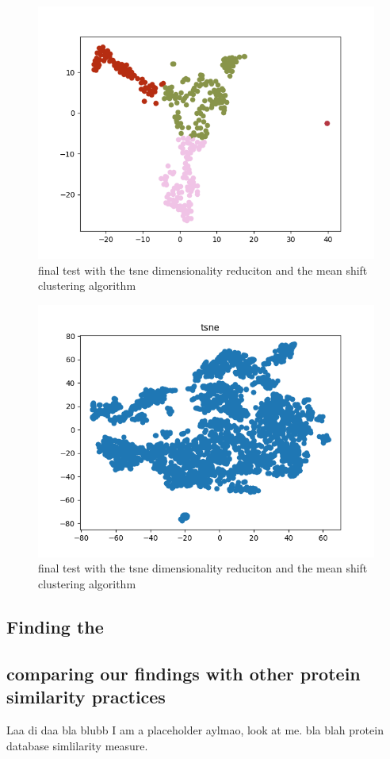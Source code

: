 \documentclass[journal]{vgtc}       %
\begin{document}
\begin{figure}[tb]
  \begin{center}
  \includegraphics[width=.75\linewidth]{MS-tsne.png}
  \end{center}
  \caption{\label{fig:tsne} final test with the tsne dimensionality reduciton and the mean shift clustering algorithm }
\end{figure}

\begin{figure}[tb]
  \begin{center}
  \includegraphics[width=.75\linewidth]{tsneFull.png}
  \end{center}
  \caption{\label{fig:tsnef} final test with the tsne dimensionality reduciton and the mean shift clustering algorithm }
\end{figure}
\subsection{Finding the }

\subsection{comparing our findings with other protein similarity practices} 
Laa di daa bla blubb I am a placeholder aylmao, look at me. bla \cite{3dsurfer} blah protein database simlilarity measure.
\end{document}
